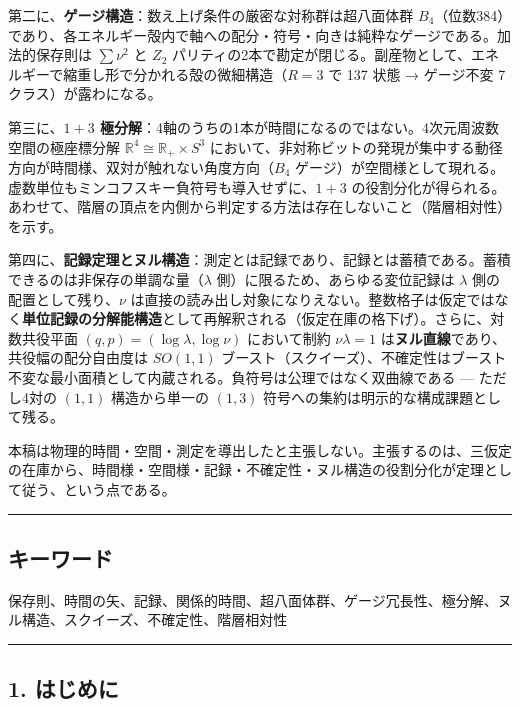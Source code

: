 \documentclass[
]{ltjsarticle}
\begin{document}
第二に、\textbf{ゲージ構造}：数え上げ条件の厳密な対称群は超八面体群
\(B_4\)（位数384）であり、各エネルギー殻内で軸への配分・符号・向きは純粋なゲージである。加法的保存則は
\(\sum\nu^2\) と \(Z_2\)
パリティの2本で勘定が閉じる。副産物として、エネルギーで縮重し形で分かれる殻の微細構造（\(R=3\)
で 137 状態 → ゲージ不変 7 クラス）が露わになる。

第三に、\textbf{\(1{+}3\)
極分解}：4軸のうちの1本が時間になるのではない。4次元周波数空間の極座標分解
\(\mathbb{R}^4\cong\mathbb{R}_+\times S^3\)
において、非対称ビットの発現が集中する動径方向が時間様、双対が触れない角度方向（\(B_4\)
ゲージ）が空間様として現れる。虚数単位もミンコフスキー負符号も導入せずに、\(1{+}3\)
の役割分化が得られる。あわせて、階層の頂点を内側から判定する方法は存在しないこと（階層相対性）を示す。

第四に、\textbf{記録定理とヌル構造}：測定とは記録であり、記録とは蓄積である。蓄積できるのは非保存の単調な量（\(\lambda\)
側）に限るため、あらゆる変位記録は \(\lambda\)
側の配置として残り、\(\nu\)
は直接の読み出し対象になりえない。整数格子は仮定ではなく\textbf{単位記録の分解能構造}として再解釈される（仮定在庫の格下げ）。さらに、対数共役平面
\((q,p)=(\log\lambda,\log\nu)\) において制約 \(\nu\lambda=1\)
は\textbf{ヌル直線}であり、共役幅の配分自由度は \(SO(1,1)\)
ブースト（スクイーズ）、不確定性はブースト不変な最小面積として内蔵される。負符号は公理ではなく双曲線である
--- ただし4対の \((1,1)\) 構造から単一の \((1,3)\)
符号への集約は明示的な構成課題として残る。

本稿は物理的時間・空間・測定を導出したと主張しない。主張するのは、三仮定の在庫から、時間様・空間様・記録・不確定性・ヌル構造の役割分化が定理として従う、という点である。

\begin{center}\rule{0.5\linewidth}{0.5pt}\end{center}

\subsection{キーワード}\label{ux30adux30fcux30efux30fcux30c9}

保存則、時間の矢、記録、関係的時間、超八面体群、ゲージ冗長性、極分解、ヌル構造、スクイーズ、不確定性、階層相対性

\begin{center}\rule{0.5\linewidth}{0.5pt}\end{center}

\subsection{1. はじめに}\label{ux306fux3058ux3081ux306b}
\end{document}
